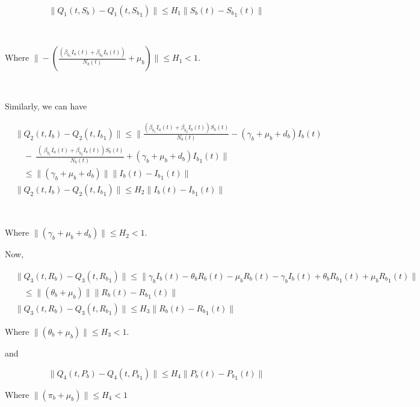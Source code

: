 \documentclass[10pt]{NSP1}
\begin{document}
~


\[
\| Q_{1}\left( t,S_{b} \right) - Q_{1}\left( t,{S_{b}}_{1} \right)\| \leq H_{1}\| S_{b}(t) - {S_{b}}_{1}(t)\|
\]


~


Where \(\| - \left( \frac{\left( \beta_{b_{1}}I_{a}(t) + \beta_{b_{2}}I_{b}(t) \right)}{N_{b}(t)} + \mu_{b} \right)\| \leq H_{1} < 1\).


~


Similarly, we can have

{\small
\[
\begin{aligned}
&\| Q_{2}\left( t,I_{b} \right) - Q_{2}\left( t,{I_{b}}_{1} \right)\| \leq \|\frac{\left( \beta_{b_{1}}I_{a}(t) + \beta_{b_{2}}I_{b}(t) \right)S_{b}(t)}{N_{b}(t)} - \left( \gamma_{b} + \mu_{b} + d_{b} \right)I_{b}(t) \\
&\quad - \ \frac{\ \left( \ \beta_{b_{1}}I_{a}(t) + \beta_{b_{2}}I_{b}(t) \right)S_{b}(t)}{N_{b}(t)} + \left( \gamma_{b} + \mu_{b} + d_{b} \right){I_{b}}_{1}(t)\| \\
&\quad \leq \|\left( \gamma_{b} + \mu_{b} + d_{b} \right)\|\| I_{b}(t) - {I_{b}}_{1}(t)\| \\
&\| Q_{2}\left( t,I_{b} \right) - Q_{2}\left( t,{I_{b}}_{1} \right)\| \leq H_{2}\| I_{b}(t) - {I_{b}}_{1}(t)\|
\end{aligned}
\]
}


~


Where \(\|\left( \gamma_{b} + \mu_{b} + d_{b} \right)\| \leq H_{2} < 1\).

Now,

\[
\begin{aligned}
&\| Q_{3}\left( t,R_{b} \right) - Q_{3}\left( t,{R_{b}}_{1} \right)\| \leq \|\gamma_{b}I_{b}(t) - \theta_{b}R_{b}(t) - \mu_{b}R_{b}(t) - \gamma_{b}I_{b}(t) + \theta_{b}{R_{b}}_{1}(t) + \mu_{b}{R_{b}}_{1}(t)\| \\
&\quad \leq \|\left( \theta_{b} + \mu_{b} \right)\|\| R_{b}(t) - {R_{b}}_{1}(t)\| \\
&\| Q_{3}\left( t,R_{b} \right) - Q_{3}\left( t,{R_{b}}_{1} \right)\| \leq H_{3}\| R_{b}(t) - {R_{b}}_{1}(t)\|
\end{aligned}
\]

Where \(\|\left( \theta_{b} + \mu_{b} \right)\| \leq H_{3} < 1\).

and

\[
\| Q_{4}\left( t,P_{b} \right) - Q_{4}\left( t,{P_{b}}_{1} \right)\| \leq H_{4}\| P_{b}(t) - {P_{b}}_{1}(t)\|
\]

Where \(\|\left( \pi_{b} + \mu_{b} \right)\| \leq H_{4} < 1\)
\end{document}
